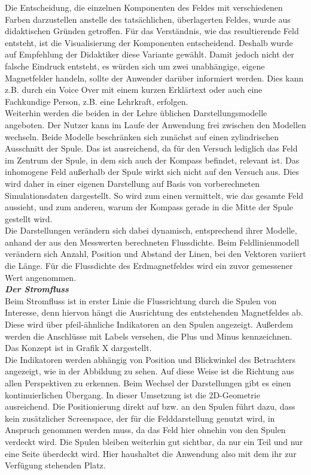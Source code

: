 Die Entscheidung, die einzelnen Komponenten des Feldes mit verschiedenen Farben darzustellen anstelle des tatsächlichen, überlagerten Feldes, wurde aus didaktischen Gründen getroffen. Für das Verständnis, wie das resultierende Feld entsteht, ist die Visualisierung der Komponenten entscheidend. Deshalb wurde auf Empfehlung der Didaktiker diese Variante gewählt. Damit jedoch nicht der falsche Eindruck entsteht, es würden sich um zwei unabhängige, eigene Magnetfelder handeln, sollte der Anwender darüber informiert werden. Dies kann z.B. durch ein Voice Over mit einem kurzen Erklärtext oder auch eine Fachkundige Person, z.B. eine Lehrkraft, erfolgen.\\

Weiterhin werden die beiden in der Lehre üblichen Darstellungsmodelle angeboten. Der Nutzer kann im Laufe der Anwendung frei zwischen den Modellen wechseln. Beide Modelle beschränken sich zunächst auf einen zylindrischen Ausschnitt der Spule. Das ist ausreichend, da für den Versuch lediglich das Feld im Zentrum der Spule, in dem sich auch der Kompass befindet, relevant ist. Das inhomogene Feld außerhalb der Spule wirkt sich nicht auf den Versuch aus. Dies wird daher in einer eigenen Darstellung auf Basis von vorberechneten Simulationsdaten dargestellt. So wird zum einen vermittelt, wie das gesamte Feld aussieht, und zum anderen, warum der Kompass gerade in die Mitte der Spule gestellt wird.\\

Die Darstellungen verändern sich dabei dynamisch, entsprechend ihrer Modelle, anhand der aus den Messwerten berechneten Flussdichte. Beim Feldlinienmodell verändern sich Anzahl, Position und Abstand der Linen, bei den Vektoren variiert die Länge. Für die Flussdichte des Erdmagnetfeldes wird ein zuvor gemessener Wert angenommen.\\


\textbf{\textit{Der Stromfluss}}\\
Beim Stromfluss ist in erster Linie die Flussrichtung durch die Spulen von Interesse, denn hiervon hängt die Ausrichtung des entstehenden Magnetfeldes ab. Diese wird über pfeil-ähnliche Indikatoren an den Spulen angezeigt. Außerdem werden die Anschlüsse mit Labels versehen, die Plus und Minus kennzeichnen. Das Konzept ist in Grafik X dargestellt.\\

Die Indikatoren werden abhängig von Position und Blickwinkel des Betrachters angezeigt, wie in der Abbildung zu sehen. Auf diese Weise ist die Richtung aus allen Perspektiven zu erkennen. Beim Wechsel der Darstellungen gibt es einen kontinuierlichen Übergang. In dieser Umsetzung ist die 2D-Geometrie ausreichend. Die Positionierung direkt auf bzw. an den Spulen führt dazu, dass kein zusätzlicher Screenspace, der für die Felddarstellung genutzt wird, in Anspruch genommen werden muss, da das Feld hier ohnehin von den Spulen verdeckt wird. Die Spulen bleiben weiterhin gut sichtbar, da nur ein Teil und nur eine Seite überdeckt wird. Hier haushaltet die Anwendung also mit dem ihr zur Verfügung stehenden Platz.\\

